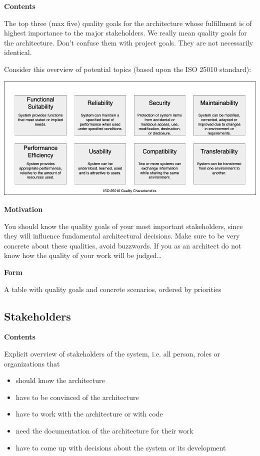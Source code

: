 \textbf{Contents}

The top three (max five) quality goals for the architecture whose
fulfillment is of highest importance to the major stakeholders. We
really mean quality goals for the architecture. Don't confuse them with
project goals. They are not necessarily identical.

Consider this overview of potential topics (based upon the ISO 25010
standard):

\includegraphics{../images/01_2_iso-25010-topics-EN.drawio.png}

\textbf{Motivation}

You should know the quality goals of your most important stakeholders,
since they will influence fundamental architectural decisions. Make sure
to be very concrete about these qualities, avoid buzzwords. If you as an
architect do not know how the quality of your work will be
judged\ldots{}

\textbf{Form}

A table with quality goals and concrete scenarios, ordered by priorities

\hypertarget{_stakeholders}{%
\subsection{Stakeholders}\label{_stakeholders}}

\textbf{Contents}

Explicit overview of stakeholders of the system, i.e. all person, roles
or organizations that

\begin{itemize}
\item
  should know the architecture
\item
  have to be convinced of the architecture
\item
  have to work with the architecture or with code
\item
  need the documentation of the architecture for their work
\item
  have to come up with decisions about the system or its development
\end{itemize}

